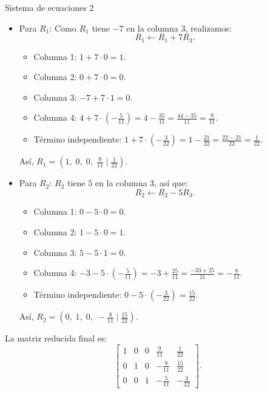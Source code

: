 \documentclass[11pt,letterpaper]{article}
\begin{document}
\begin{inciso}{Sistema de ecuaciones 2}
\begin{itemize}
    \item Para \(R_1\):  
      Como \(R_1\) tiene \(-7\) en la columna 3, realizamos:
      \[
      R_1 \leftarrow R_1 + 7R_3.
      \]
\begin{itemize}
      \item Columna 1: \(1 + 7\cdot0 = 1\).
      \item Columna 2: \(0 + 7\cdot0 = 0\).
      \item Columna 3: \(-7 + 7\cdot1 = 0\).
      \item Columna 4: \(4 + 7\cdot\left(-\frac{5}{11}\right) = 4 - \frac{35}{11} = \frac{44-35}{11} = \frac{9}{11}\).
      \item Término independiente: \(1 + 7\cdot\left(-\frac{3}{22}\right) = 1 - \frac{21}{22} = \frac{22-21}{22} = \frac{1}{22}\).
\end{itemize}      
    
      Así, \(R_1 = \left(1,\;0,\;0,\;\frac{9}{11} \;|\;\frac{1}{22}\right)\).
    
    \item Para \(R_2\):  
      \(R_2\) tiene \(5\) en la columna 3, así que:
      \[
      R_2 \leftarrow R_2 - 5R_3.
      \]
\begin{itemize}
    \item Columna 1: \(0 - 5\cdot0 = 0\).
    \item Columna 2: \(1 - 5\cdot0 = 1\).
    \item Columna 3: \(5 - 5\cdot1 = 0\).
    \item Columna 4: \(-3 - 5\cdot\left(-\frac{5}{11}\right) = -3 + \frac{25}{11} = \frac{-33+25}{11} = -\frac{8}{11}\).
    \item Término independiente: \(0 - 5\cdot\left(-\frac{3}{22}\right) = \frac{15}{22}\).
\end{itemize}      
    
      Así, \(R_2 = \left(0,\;1,\;0,\;-\frac{8}{11} \;|\; \frac{15}{22}\right)\).
    
\end{itemize}

La matriz reducida final es:
\[
\left[\begin{array}{cccc|c}
1 & 0 & 0 & \frac{9}{11} & \frac{1}{22} \\[1mm]
0 & 1 & 0 & -\frac{8}{11} & \frac{15}{22} \\[1mm]
0 & 0 & 1 & -\frac{5}{11} & -\frac{3}{22}
\end{array}\right].
\]


\end{inciso}
\end{document}

